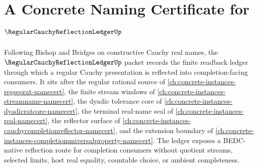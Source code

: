 \chapter{A Concrete Naming Certificate for $\RegularCauchyReflectionLedgerUp$}
\label{ch:concrete-instances-regular-cauchy-reflection-ledger-namecert}

Following Bishop and Bridges on constructive Cauchy real names, the $\RegularCauchyReflectionLedgerUp$ packet records the finite readback ledger through which a regular Cauchy presentation is reflected into completion-facing consumers. It sits after the regular rational source of \autoref{ch:concrete-instances-regseqrat-namecert}, the finite stream windows of \autoref{ch:concrete-instances-streamname-namecert}, the dyadic tolerance core of \autoref{ch:concrete-instances-dyadicratcore-namecert}, the terminal real-name seal of \autoref{ch:concrete-instances-real-namecert}, the reflector surface of \autoref{ch:concrete-instances-cauchycompletionreflector-namecert}, and the extension boundary of \autoref{ch:concrete-instances-completionuniversalproperty-namecert}. The ledger exposes a BEDC-native reflection route for completion consumers without quotient streams, selected limits, host real equality, countable choice, or ambient completeness.

